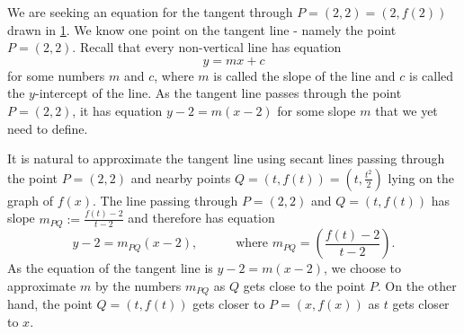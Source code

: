 \begin{figure}[H]
	\centering
    \caption{   \label{figTangentIdeaFor} }
\end{figure}


We are seeking an equation for the tangent through $P=(2,2)=(2, f(2))$ drawn in \ref{figTangentIdeaFor}. We know one point on the tangent line - namely the point $P=(2,2)$. Recall that every non-vertical line has equation
\[
y=mx+c
\]
for some numbers $m$ and $c$, where $m$ is called the slope
of the line and $c$ is called the $y$-intercept of the line. As the tangent line passes through the point $P=(2,2)$, it has equation $y-2=m(x-2)$ for some slope $m$ that we yet need to define.

It is natural to approximate the tangent line using secant lines passing through the point $ P=(2, 2)$ and nearby points $Q=(t,f(t))=(t, \frac{t^2}{2})$ lying on the graph of $f(x)$. The line passing through $P=(2,2) $ and $Q=(t,f(t))$ has slope $m_{PQ}:=\frac{f(t)-2}{t-2}$ and therefore has equation
\[
y-2=m_{PQ}(x-2), \quad\quad \quad\text{where~} m_{PQ}= \left(\frac{f(t)-2}{t-2}\right).
\]
As the equation of the tangent line is $y-2=m(x-2)$, we choose to approximate $m$ by the numbers $m_{PQ}$ as $Q$ gets close to the point $P$. On the other hand, the point $Q=(t,f(t))$ gets closer to $P= (x, f(x))$ as $t$ gets closer to $x$.


